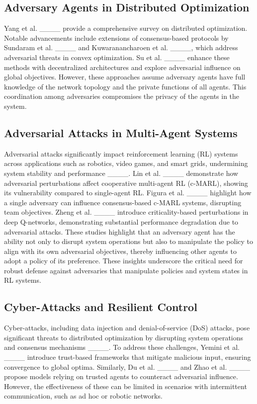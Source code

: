 \subsection{Adversary Agents in Distributed Optimization}
Yang et al. ____ provide a comprehensive survey on distributed optimization. Notable advancements include extensions of consensus-based protocols by Sundaram et al. ____ and Kuwaranancharoen et al. ____, which address adversarial threats in convex optimization. Su et al. ____ enhance these methods with decentralized architectures and explore adversarial influence on global objectives. However, these approaches assume adversary agents have full knowledge of the network topology and the private functions of all agents. This coordination among adversaries compromises the privacy of the agents in the system.

\subsection{Adversarial Attacks in Multi-Agent Systems}
Adversarial attacks significantly impact reinforcement learning (RL) systems across applications such as robotics, video games, and smart grids, undermining system stability and performance ____. Lin et al. ____ demonstrate how adversarial perturbations affect cooperative multi-agent RL (c-MARL), showing its vulnerability compared to single-agent RL. Figura et al. ____ highlight how a single adversary can influence consensus-based c-MARL systems, disrupting team objectives. Zheng et al. ____ introduce criticality-based perturbations in deep Q-networks, demonstrating substantial performance degradation due to adversarial attacks. These studies highlight that an adversary agent has the ability not only to disrupt system operations but also to manipulate the policy to align with its own adversarial objectives, thereby influencing other agents to adopt a policy of its preference. These insights underscore the critical need for robust defense against adversaries that manipulate policies and system states in RL systems.

\subsection{Cyber-Attacks and Resilient Control}
Cyber-attacks, including data injection and denial-of-service (DoS) attacks, pose significant threats to distributed optimization by disrupting system operations and consensus mechanisms ____. To address these challenges, Yemini et al. ____ introduce trust-based frameworks that mitigate malicious input, ensuring convergence to global optima. Similarly, Du et al. ____ and Zhao et al. ____ propose models relying on trusted agents to counteract adversarial influence. However, the effectiveness of these can be limited in scenarios with intermittent communication, such as ad hoc or robotic networks.

